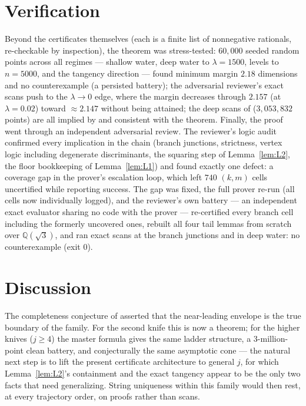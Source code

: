 \documentclass[11pt]{article}
\begin{document}
\section{Verification}
Beyond the certificates themselves (each is a finite list of nonnegative
rationals, re-checkable by inspection), the theorem was stress-tested:
$60{,}000$ seeded random points across all regimes --- shallow water, deep
water to $\lambda=1500$, levels to $n=5000$, and the tangency direction ---
found minimum margin $2.18$ dimensions and no counterexample (a persisted
battery); the adversarial reviewer's exact scans push to the $\lambda\to0$
edge, where the margin decreases through $2.157$ (at $\lambda=0.02$) toward
$\approx2.147$ without being attained; the deep scans of
\cite{master} ($3{,}053{,}832$ points) are all implied by and consistent
with the theorem. Finally, the proof went through an independent adversarial review. The
reviewer's logic audit confirmed every implication in the chain (branch
junctions, strictness, vertex logic including degenerate discriminants, the
squaring step of Lemma~\ref{lem:L2}, the floor bookkeeping of
Lemma~\ref{lem:L1}) and found exactly one defect: a coverage gap in the
prover's escalation loop, which left $740$ $(k,m)$ cells uncertified while
reporting success. The gap was fixed, the full prover re-run (all cells now
individually logged), and the reviewer's own battery --- an independent
exact evaluator sharing no code with the prover --- re-certified every
branch cell including the formerly uncovered ones, rebuilt all four tail
lemmas from scratch over $\mathbb{Q}(\sqrt3)$, and ran exact scans at the
branch junctions and in deep water: no counterexample (exit $0$).

\section{Discussion}
The completeness conjecture of \cite{shore} asserted that the near-leading
envelope is the true boundary of the family. For the second knife this is
now a theorem; for the higher knives ($j\ge4$) the master formula
\cite{master} gives the same ladder structure, a $3$-million-point clean
battery, and conjecturally the same asymptotic cone --- the natural next step is to lift the
present certificate architecture to general $j$, for which
Lemma~\ref{lem:L2}'s containment and the exact tangency appear to be the
only two facts that need generalizing. String uniqueness within this family
would then rest, at every trajectory order, on proofs rather than scans.
\end{document}
